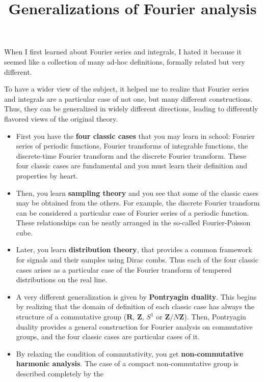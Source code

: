 \title{Generalizations of Fourier analysis}

When I first learned about Fourier series and integrals, I hated it
because it seemed like a collection of many ad-hoc definitions,
formally related but very different.

To have a wider view of the subject, it helped me to realize that
Fourier series and integrals are a particular case of not one,
but many different constructions.  Thus, they can be generalized in
widely different directions, leading to differently flavored views of
the original theory.

\newcommand{\R}{\mathbf{R}}
\newcommand{\Z}{\mathbf{Z}}
\newcommand{\Q}{\mathbf{Q}}
\newcommand{\C}{\mathbf{C}}
\newcommand{\U}{\mathbf{U}}
\newcommand{\ud}{\mathrm{d}}

\begin{itemize}
	\item First you have the {\bf four classic cases} that you may learn in
		school: Fourier series of periodic functions, Fourier
		transforms of integrable functions, the discrete-time Fourier
		transform and the discrete Fourier transform.
		These four classic cases are fundamental and you must learn
		their definition and properties by heart.
	\item Then, you learn {\bf sampling theory} and you see that
		some of the classic cases may be obtained from the others.
		For example, the discrete Fourier transform can be
		considered a particular case of Fourier series of a
		periodic function.
		These relationships can be neatly arranged in the
		so-called Fourier-Poisson cube.
	\item Later, you learn {\bf distribution theory}, that
		provides a common framework for signals and their
		samples using Dirac combs.  Thus each of the four
		classic cases arises as a particular case of the
		Fourier transform of tempered distributions on the
		real line.
	\item A very different generalization is given by {\bf
		Pontryagin duality}.  This begins by realizing that
		the domain of definition of each classic case has
		always the structure of a commutative group ($\R$,
		$\Z$, $S^1$ or $\Z/N\Z$).  Then, Pontryagin duality
		provides a general construction for Fourier analysis
		on commutative groups, and the four classic cases
		are particular cases of it.
	\item By relaxing the condition of commutativity, you get {\bf
		non-commutative harmonic analysis}.  The case of a compact
		non-commutative group is described completely by the

\end{itemize}
